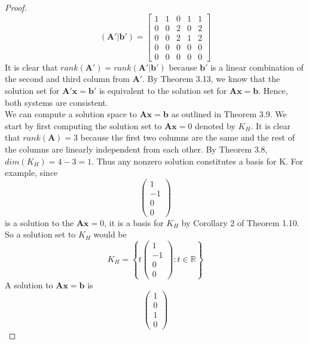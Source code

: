 \documentclass[11pt]{scrartcl}
\begin{document}
\begin{enumerate}[label=\alph*.]
{\begin{proof}
		      \[
				(\mathbf{A'}|\mathbf{b'})=
			      \left [ \begin{array}{cccc|c}
					      1 & 1 & 0 & 1 & 1 \\
					      0 & 0 & 2 & 0 & 2 \\
					      0 & 0 & 2 & 1 & 2 \\
					      0 & 0 & 0 & 0 & 0 \\
					      0 & 0 & 0 & 0 & 0
				      \end{array} \right ]
		      \]
		      It is clear that  $rank(\mathbf{A'}) = rank(\mathbf{A'}|\mathbf{b'})$ because
		      $\mathbf{b'}$ is a linear combination of the second and third column from
			  $\mathbf{A'}$. By Theorem 3.13, we know that the solution set for $\mathbf{A'x=b'}$
			  is equivalent to the solution set for $\mathbf{Ax=b}$. Hence, both systems are consistent. \\
		      We can compute a solution space to $\mathbf{Ax=b}$ as outlined in Theorem 3.9. We start by first computing the
		      solution set to $\mathbf{Ax}=0$ denoted by $K_H$. It is clear that $rank(\mathbf{A}) = 3$ because the first two
		      columns are the same and the rest of the columns are linearly independent from each other.
		      By Theorem 3.8, $dim(K_H) = 4 - 3 = 1$. Thus any nonzero solution constitutes a basis for K. For example, since
		      $$
			      \begin{pmatrix}
				      1  \\
				      -1 \\
				      0  \\
				      0
			      \end{pmatrix}
		      $$
		      is a solution to the $\mathbf{Ax}=0$, it is a basis for $K_H$ by Corollary 2 of Theorem 1.10.
		      So a solution set to $K_H$ would be
		      \[
			      K_H=
			      \left\{
			      t\begin{pmatrix}
				      1  \\
				      -1 \\
				      0  \\
				      0
			      \end{pmatrix}: t \in \mathbb{R}
			      \right\}
		      \]
		      A solution to $\mathbf{Ax=b}$ is
		      $$
			      \begin{pmatrix}
				      1 \\
				      0 \\
				      1 \\
				      0
			      \end{pmatrix}
$$
\end{proof}}
\end{enumerate}
\end{document}
